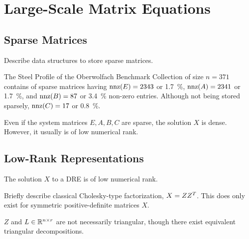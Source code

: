 \chapter{Large-Scale Matrix Equations}

\section{Sparse Matrices}
Describe data structures to store sparse matrices.

\begin{example}
  The Steel Profile of the Oberwolfach Benchmark Collection of size $n=371$
  contains of sparse matrices having
  $\operatorname{nnz}(E) = 2343$ or \SI{1.7}{\percent},
  $\operatorname{nnz}(A) = 2341$ or \SI{1.7}{\percent}, and
  $\operatorname{nnz}(B) = 87$ or \SI{3.4}{\percent} non-zero entries.
  Although not being stored sparsely, $\operatorname{nnz}(C) = 17$ or \SI{0.8}{\percent}.
\end{example}

Even if the system matrices $E, A, B, C$ are sparse,
the solution $X$ is dense.
However, it usually is of low numerical rank.

\section{Low-Rank Representations}
\label{sec:lowrank}

\begin{theorem}
\label{thm:lowrank}
The solution $X$ to a \ac{DRE} is of low numerical rank.
\end{theorem}

Briefly describe classical Cholesky-type factorization, $X=ZZ^T$.
This does only exist for symmetric positive-definite matrices $X$.


$Z$ and $L \in \mathbb{R}^{n\times r}$ are not necessarily triangular,
though there exist equivalent triangular decompositions.

